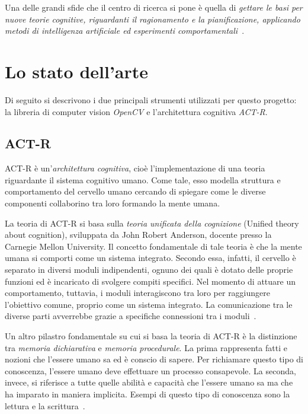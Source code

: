 	Una delle grandi sfide che il centro di ricerca si pone è quella di \emph{gettare le basi per nuove teorie cognitive, riguardanti il ragionamento e la pianificazione, applicando metodi di intelligenza artificiale ed esperimenti comportamentali~\cite{TesiEnr}}.

 

	\section*{Lo stato dell'arte}
	Di seguito si descrivono i due principali strumenti utilizzati per questo progetto: la libreria di computer vision \emph{\mbox{OpenCV}} e l'architettura cognitiva \mbox{\emph{ACT-R}}.
		
			\subsection*{ACT-R}
				\mbox{ACT-R} è un'\emph{architettura cognitiva}, cioè l'implementazione di una teoria riguardante il sistema cognitivo umano. Come tale, esso modella struttura e comportamento del cervello umano cercando di spiegare come le diverse componenti collaborino tra loro formando la mente umana.
				
				La teoria di \mbox{ACT-R} si basa sulla \emph{teoria unificata della cognizione} (Unified theory about cognition), sviluppata da John Robert Anderson, docente presso la Carnegie Mellon University. 
				Il concetto fondamentale di tale teoria è che la mente umana si comporti come un sistema integrato.
				Secondo essa, infatti, il cervello è separato in diversi moduli indipendenti, ognuno dei quali è dotato delle proprie funzioni ed è incaricato di svolgere compiti specifici.
				Nel momento di attuare un comportamento, tuttavia, i moduli interagiscono tra loro per raggiungere l'obiettivo comune, proprio come un sistema integrato. 
				La comunicazione tra le diverse parti avverrebbe grazie a specifiche connessioni tra i moduli~\cite{Anderson04anintegrated}.

				Un altro pilastro fondamentale su cui si basa la teoria di \mbox{ACT-R} è la distinzione tra \emph{memoria dichiarativa} e \emph{memoria procedurale}. La prima rappresenta fatti e nozioni che l'essere umano sa ed è conscio di sapere. Per richiamare questo tipo di conoscenza, l'essere umano deve effettuare un processo consapevole. La seconda, invece, si riferisce a tutte quelle abilità e capacità che l'essere umano sa ma che ha imparato in maniera implicita. Esempi di questo tipo di conoscenza sono la lettura e la scrittura~\cite{anderson1976language}. 

